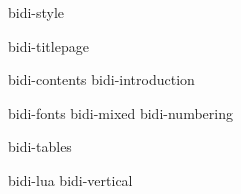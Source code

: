 
\environment bidi-style

\startdocument

    \component bidi-titlepage

    \startfrontmatter
        \component bidi-contents
        \component bidi-introduction
    \stopfrontmatter

    \startbodymatter
        \component bidi-fonts
        \component bidi-mixed
        \component bidi-numbering

        \component bidi-tables

        \component bidi-lua
        \component bidi-vertical
    \stopbodymatter

\stopdocument
